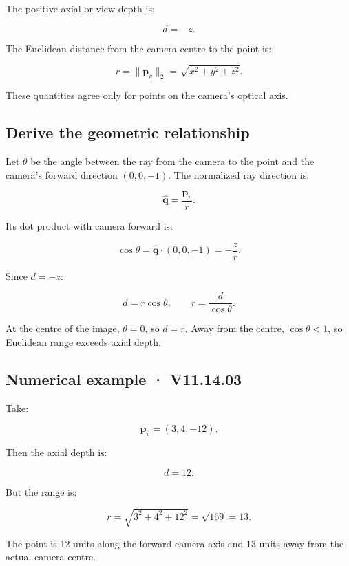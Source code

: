 The positive axial or view depth is:

\[ \boxed{d=-z}. \]

The Euclidean distance from the camera centre to the point is:

\[ \boxed{ r=\|\mathbf p_v\|_2=\sqrt{x^2+y^2+z^2}. } \]

These quantities agree only for points on the camera's optical axis.

\subsection{Derive the geometric relationship}\label{02-foundations-ii-ch035-derive-the-geometric-relationship}

\hypertarget{02-foundations-ii-ch035-derive-the-geometric-relationship}{}

Let \(\theta\) be the angle between the ray from the camera to the point and the camera's forward direction \((0,0,-1)\). The normalized ray direction is:

\[ \hat{\mathbf q}=\frac{\mathbf p_v}{r}. \]

Its dot product with camera forward is:

\[ \cos\theta = \hat{\mathbf q}\cdot(0,0,-1) = -\frac zr. \]

Since \(d=-z\):

\[ \boxed{d=r\cos\theta}, \qquad \boxed{r=\frac d{\cos\theta}}. \]

At the centre of the image, \(\theta=0\), so \(d=r\). Away from the centre, \(\cos\theta<1\), so Euclidean range exceeds axial depth.

\subsection{Numerical example · V11.14.03}\label{02-foundations-ii-ch035-numerical-example-v11.14.03}

\hypertarget{02-foundations-ii-ch035-numerical-example-v11.14.03}{}

Take:

\[ \mathbf p_v=(3,4,-12). \]

Then the axial depth is:

\[ \boxed{d=12}. \]

But the range is:

\[ r=\sqrt{3^2+4^2+12^2} =\sqrt{169} =\boxed{13}. \]

The point is 12 units along the forward camera axis and 13 units away from the actual camera centre.

